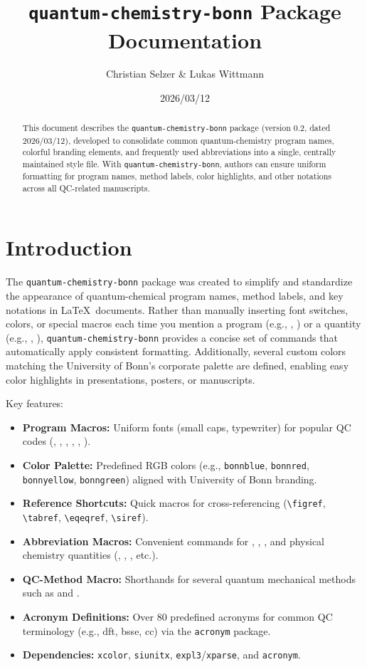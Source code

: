 \documentclass[a4paper,12pt]{article}
\title{\texttt{quantum-chemistry-bonn} Package Documentation}
\author{Christian Selzer \& Lukas Wittmann}
\date{2026/03/12}
\begin{document}
\maketitle

\begin{abstract}
This document describes the \texttt{quantum-chemistry-bonn} package (version 0.2, dated 2026/03/12), developed to consolidate common quantum-chemistry program names, colorful branding elements, and frequently used abbreviations into a single, centrally maintained style file. With \texttt{quantum-chemistry-bonn}, authors can ensure uniform formatting for program names, method labels, color highlights, and other notations across all QC-related manuscripts. 
\end{abstract}

\tableofcontents
\bigskip

\section{Introduction}
The \texttt{quantum-chemistry-bonn} package was created to simplify and standardize the appearance of quantum-chemical program names, method labels, and key notations in \LaTeX\ documents. Rather than manually inserting font switches, colors, or special macros each time you mention a program (e.g., \orca, \xtb) or a quantity (e.g., \pka, \dgsolv), \texttt{quantum-chemistry-bonn} provides a concise set of commands that automatically apply consistent formatting. Additionally, several custom colors matching the University of Bonn’s corporate palette are defined, enabling easy color highlights in presentations, posters, or manuscripts.  

\medskip
Key features:
\begin{itemize}
  \item \textbf{Program Macros:} Uniform fonts (small caps, typewriter) for popular QC codes (\orca, \censo, \draco, \crest, \xtb, \tblite).
  \item \textbf{Color Palette:} Predefined RGB colors (e.g., \texttt{bonnblue}, \texttt{bonnred}, \texttt{bonnyellow}, \texttt{bonngreen}) aligned with University of Bonn branding.
  \item \textbf{Reference Shortcuts:} Quick macros for cross-referencing (\verb|\figref|, \verb|\tabref|, \verb|\eqeqref|, \verb|\siref|).
  \item \textbf{Abbreviation Macros:} Convenient commands for \etal, \ie, \eg, and physical chemistry quantities (\pka, \dgsolv, \kcalpmol, etc.).
  \item \textbf{QC-Method Macro:} Shorthands for several quantum mechanical methods such as  and .
  \item \textbf{Acronym Definitions:} Over 80 predefined acronyms for common QC terminology (e.g., \ac{dft}, \ac{bsse}, \ac{cc}) via the \texttt{acronym} package.
  \item \textbf{Dependencies:} \texttt{xcolor}, \texttt{siunitx}, \texttt{expl3}/\texttt{xparse}, and \texttt{acronym}.
\end{itemize}
\end{document}
